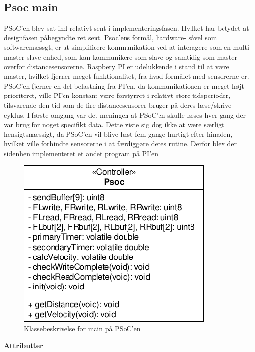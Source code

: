 \subsection{Psoc main} \label{sub:psoc_main}

PSoC'en blev sat ind relativt sent i implementeringsfasen. Hvilket har betydet at designfasen påbegyndte ret sent.
Psoc'ens formål, hardware- såvel som softwaremæssgt, er at simplificere \IIC kommunikation ved at interagere som en multi-master-slave enhed, som kan kommunikere som \IIC slave og samtidig som \IIC master overfor distancesensorerne. Raspbery PI er udelukkende i stand til at være master, hvilket fjerner meget funktionalitet, fra hvad formålet med sensorerne er. PSoC'en fjerner en del belastning fra PI'en, da \IIC kommunikationen er meget højt prioriteret, ville PI'en konstant være forstyrret i relativt store tidsperioder, tilsvarende den tid som de fire distancesensorer bruger på deres læse/skrive cyklus. I første omgang var det meningen at PSoC'en skulle læses hver gang der var brug for noget specifikt data. Dette viste sig dog ikke at være særligt hensigtsmæssigt, da PSoC'en vil blive læst fem gange hurtigt efter hinaden, hvilket ville forhindre sensorerne i at færdiggøre deres rutine. Derfor blev der sidenhen implementeret et andet program på PI'en. 

\begin{figure}[h]
\centering
\includegraphics[]{../fig/diagrammer/psoc/cd_psoc.pdf}
\caption{Klassebeskrivelse for main på PSoC'en}
\label{fig:cd_main_psoc}
\end{figure}

\textbf{Attributter}

